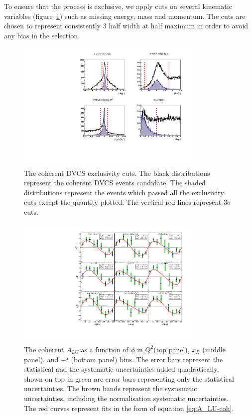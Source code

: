 \documentclass[nofootinbib,twocolumn,showpacs,prl,superscriptaddress,secnumarabic,amssymb,nobibnotes,aps,floatfix]{revtex4}
\begin{document}
To ensure that the process is exclusive, we apply cuts on several kinematic 
variables (figure~\ref{fig:kin-cuts}) such as missing energy,
mass and momentum. The cuts are chosen to represent consistently 3 half width 
at half maximum in order to avoid any bias in the selection.




\begin{figure}[tb]
\includegraphics[width=8.9cm]{figs/coh_exc_cuts.pdf}
\caption{ The coherent DVCS exclusivity cuts. The black
distributions represent the coherent DVCS events candidate. The shaded
distributions represent the events which passed all the exclusivity cuts
except the quantity plotted. The vertical red lines represent $3\sigma$ cuts.}
\label{fig:kin-cuts}
\end{figure}


\begin{figure}[tb]
\includegraphics[width=8.9cm]{figs/coherent-ALU.pdf}
\caption{The coherent $A_{LU}$ as a function of $\phi$ in
   $Q^{2}$(top panel), $x_{B}$ (middle panel), and $-t$ (bottom panel) bins.  
   The error bars represent the statistical and the systematic uncertainties 
   added quadratically, shown on top in green are error bars representing only 
   the statistical uncertainties. The brown bands represent the systematic
uncertainties, including the normalisation systematic uncertainties. The red
curves represent fits in the form of equation \ref{eq:A_LU-coh}.}
\label{fig:alu}
\end{figure}
\end{document}
